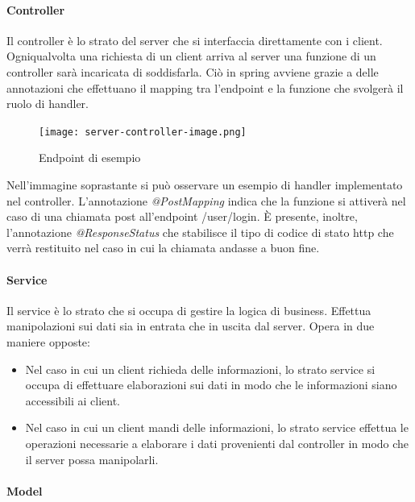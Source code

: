 \documentclass[../manuale-manutentore.tex]{subfiles}
\begin{document}
\paragraph{Controller}%
\label{par:controller}

Il controller è lo strato del server che si interfaccia direttamente con i client.
Ogniqualvolta una richiesta di un client arriva al server una funzione di un controller sarà incaricata di soddisfarla.
Ciò in spring avviene grazie a delle annotazioni che effettuano il mapping tra l'endpoint e la funzione che svolgerà il ruolo di handler.

\begin{figure}[H]
  \centering
  \texttt{[image: server-controller-image.png]}
  \caption{Endpoint di esempio}%
   \label{fig:immagine che illustra un endpoint di esempio}
\end{figure}

Nell'immagine soprastante si può osservare un esempio di handler implementato nel controller.
L'annotazione \textit{@PostMapping} indica che la funzione si attiverà nel caso di una chiamata post all'endpoint /user/login.
È presente, inoltre, l'annotazione \textit{@ResponseStatus} che stabilisce il tipo di codice di stato http che verrà restituito nel caso in cui la chiamata andasse a buon fine.

\paragraph{Service}%
\label{par:service}

Il service è lo strato che si occupa di gestire la logica di business.
Effettua manipolazioni sui dati sia in entrata che in uscita dal server.
Opera in due maniere opposte:
\begin{itemize}
  \item Nel caso in cui un client richieda delle informazioni, lo strato service si occupa di effettuare elaborazioni sui dati in modo che le informazioni siano accessibili ai client.
  \item Nel caso in cui un client mandi delle informazioni, lo strato service effettua le operazioni necessarie a elaborare i dati provenienti dal controller in modo che il server possa manipolarli.
\end{itemize}

\paragraph{Model}%
\label{par:model}
\end{document}
